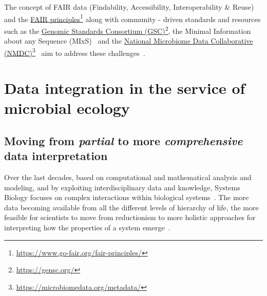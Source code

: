       The concept of FAIR data (Findability, Accessibility, Interoperability \& Reuse)
      and the \href{https://www.go-fair.org/fair-principles/}{FAIR principles}\footnote{\href{https://www.go-fair.org/fair-principles/}{https://www.go-fair.org/fair-principles/}}
      along with community - driven standards and resources such as 
      the \href{https://gensc.org/}{Genomic Standards Consortium (GSC)}\footnote{\href{https://gensc.org/}{https://gensc.org/}},
      the Minimal Information about any Sequence (MIxS)~\cite{yilmaz2011minimum, yilmaz2011genomic}
      and the \href{https://microbiomedata.org/metadata/}{National Microbiome Data Collaborative (NMDC)}\footnote{\href{https://microbiomedata.org/metadata/}{https://microbiomedata.org/metadata/}}~\cite{wood2020national}
      aim to address these challenges~\cite{wilkinson2016fair}.
\section{Data integration in the service of microbial ecology}

   \subsection{Moving from \textit{partial} to more \textit{comprehensive} data interpretation}
   \label{subsec:integration_intro}
      Over the last decades, based on
      computational and mathematical analysis and modeling,
      and by exploiting interdisciplinary data and knowledge, 
      Systems Biology focuses on complex interactions within biological systems~\cite{tavassoly2018systems}.
      The more data becoming available from all the different levels
      of hierarchy of life, the more feasible for scientists to 
      move from reductionism to more holistic approaches 
      for interpreting how the properties of a system emerge~\cite{noble2008music}.

